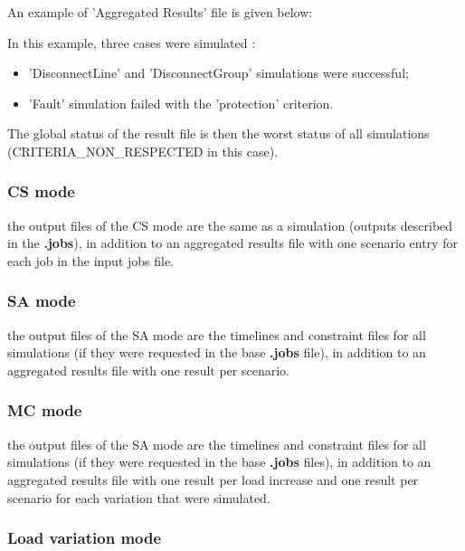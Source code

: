 \documentclass[a4paper, 12pt]{report}
\begin{document}
An example of 'Aggregated Results' file is given below:



In this example, three cases were simulated :
\begin{itemize}
  \item 'DisconnectLine' and 'DisconnectGroup' simulations were successful;
  \item 'Fault' simulation failed with the 'protection' criterion.
\end{itemize}
The global status of the result file is then the worst status of all simulations (CRITERIA\_NON\_RESPECTED in this case).

\subsubsection{CS mode}

the output files of the CS mode are the same as a \Dynawo simulation (outputs described in the \textbf{.jobs}), in addition to an aggregated 
results file with one scenario entry for each job in the input jobs file.


\subsubsection{SA mode}

the output files of the SA mode are the timelines and constraint files for all simulations (if they were requested in the base \textbf{.jobs} file), in addition to an aggregated 
results file with one result per scenario.

\subsubsection{MC mode}

the output files of the SA mode are the timelines and constraint files for all simulations (if they were requested in the base \textbf{.jobs} files), in addition to an aggregated 
results file with one result per load increase and one result per scenario for each variation that were simulated.




\subsubsection{Load variation mode}
\end{document}
